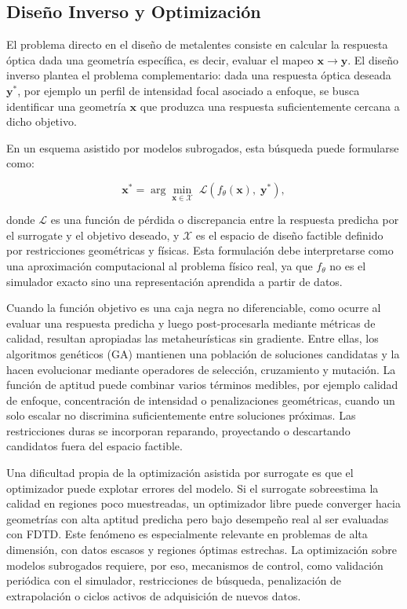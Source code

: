 \subsection{Diseño Inverso y Optimización}\label{subsec:diseno_inverso}

El problema directo en el diseño de metalentes consiste en calcular la respuesta óptica dada una geometría específica, es decir, evaluar el mapeo $\mathbf{x} \rightarrow \mathbf{y}$. El diseño inverso plantea el problema complementario: dada una respuesta óptica deseada $\mathbf{y}^*$, por ejemplo un perfil de intensidad focal asociado a enfoque, se busca identificar una geometría $\mathbf{x}$ que produzca una respuesta suficientemente cercana a dicho objetivo.

En un esquema asistido por modelos subrogados, esta búsqueda puede formularse como:

\begin{equation}
\mathbf{x}^* = \arg\min_{\mathbf{x} \in \mathcal{X}}\; \mathcal{L}\!\left(f_{\theta}(\mathbf{x}),\; \mathbf{y}^*\right),
\label{eq:inverse_opt}
\end{equation}

\noindent donde $\mathcal{L}$ es una función de pérdida o discrepancia entre la respuesta predicha por el surrogate y el objetivo deseado, y $\mathcal{X}$ es el espacio de diseño factible definido por restricciones geométricas y físicas. Esta formulación debe interpretarse como una aproximación computacional al problema físico real, ya que $f_{\theta}$ no es el simulador exacto sino una representación aprendida a partir de datos.

Cuando la función objetivo es una caja negra no diferenciable, como ocurre al evaluar una respuesta predicha y luego post-procesarla mediante métricas de calidad, resultan apropiadas las metaheurísticas sin gradiente. Entre ellas, los algoritmos genéticos (GA) mantienen una población de soluciones candidatas y la hacen evolucionar mediante operadores de selección, cruzamiento y mutación. La función de aptitud puede combinar varios términos medibles, por ejemplo calidad de enfoque, concentración de intensidad o penalizaciones geométricas, cuando un solo escalar no discrimina suficientemente entre soluciones próximas. Las restricciones duras se incorporan reparando, proyectando o descartando candidatos fuera del espacio factible.

Una dificultad propia de la optimización asistida por surrogate es que el optimizador puede explotar errores del modelo. Si el surrogate sobreestima la calidad en regiones poco muestreadas, un optimizador libre puede converger hacia geometrías con alta aptitud predicha pero bajo desempeño real al ser evaluadas con FDTD. Este fenómeno es especialmente relevante en problemas de alta dimensión, con datos escasos y regiones óptimas estrechas. La optimización sobre modelos subrogados requiere, por eso, mecanismos de control, como validación periódica con el simulador, restricciones de búsqueda, penalización de extrapolación o ciclos activos de adquisición de nuevos datos.

